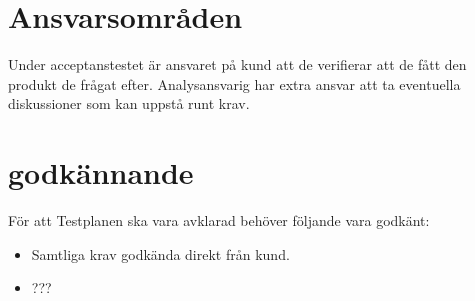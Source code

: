 \documentclass[10pt]{article}
\begin{document}
	
\section{Ansvarsområden}
	Under acceptanstestet är ansvaret på kund att de verifierar att de fått den produkt de frågat efter. Analysansvarig har extra ansvar att ta eventuella diskussioner som kan uppstå runt krav.
	

	

	
	
\section{godkännande}
	För att Testplanen ska vara avklarad behöver följande vara godkänt:
	\begin{itemize}
	 \item Samtliga krav godkända direkt från kund.
	 \item {\color{red}???}
	\end{itemize}
	
\end{document}
